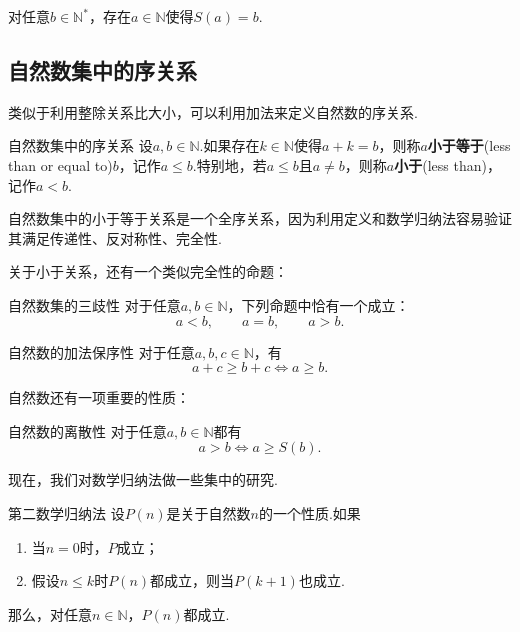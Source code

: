 \documentclass[lang=cn, zihao=5]{elegantbook}
\begin{document}
\begin{proposition}
	对任意$b \in \mathbb{N}^*$，存在$a \in \mathbb{N}$使得$S(a)=b$.
\end{proposition}

\subsection{自然数集中的序关系}

类似于利用整除关系比大小，可以利用加法来定义自然数的序关系.

\begin{definition}{自然数集中的序关系}
	设$a,b \in \mathbb{N}$.如果存在$k \in \mathbb{N}$使得$a+k=b$，则称$a$\textbf{小于等于}(less than or equal to)$b$，记作$a \leq b$.特别地，若$a \leq b$且$a \neq b$，则称$a$\textbf{小于}(less than)，记作$a<b$.
\end{definition}

自然数集中的小于等于关系是一个全序关系，因为利用定义和数学归纳法容易验证其满足传递性、反对称性、完全性.

关于小于关系，还有一个类似完全性的命题：

\begin{proposition}{自然数集的三歧性}
	对于任意$a,b \in \mathbb{N}$，下列命题中恰有一个成立：$$a<b, \qquad a=b, \qquad a>b.$$
\end{proposition}


\begin{proposition}{自然数的加法保序性}
	对于任意$a,b,c \in \mathbb{N}$，有$$a+c \geq b+c \Leftrightarrow a \geq b.$$
\end{proposition}

自然数还有一项重要的性质：

\begin{proposition}{自然数的离散性}
	对于任意$a,b \in \mathbb{N}$都有$$a>b \Leftrightarrow a \geq S(b).$$
\end{proposition}

现在，我们对数学归纳法做一些集中的研究.

\begin{theorem}{第二数学归纳法}
	设$P(n)$是关于自然数$n$的一个性质.如果
	\begin{enumerate}
		\item 当$n=0$时，$P$成立；
		\item 假设$n \leq k$时$P(n)$都成立，则当$P(k+1)$也成立.
	\end{enumerate}
	那么，对任意$n \in \mathbb{N}$，$P(n)$都成立.
\end{theorem}
\end{document}
